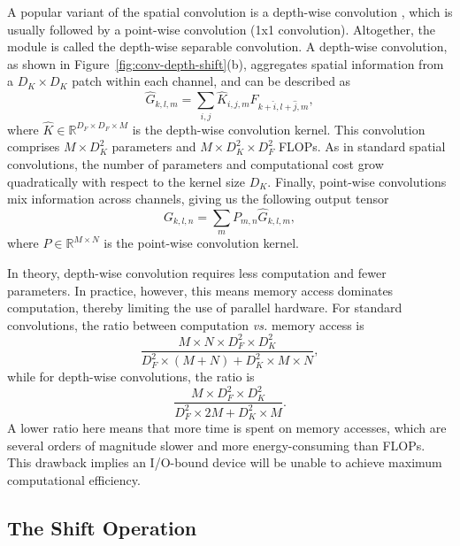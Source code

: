 \documentclass[10pt,twocolumn,letterpaper]{article}
\begin{document}
A popular variant of the spatial convolution is a depth-wise  convolution \cite{MobileNet,Xception}, which is usually followed by a point-wise convolution (1x1 convolution). Altogether, the module is called the depth-wise separable convolution.
A depth-wise convolution, as shown in Figure~\ref{fig:conv-depth-shift}(b), aggregates spatial information from a $D_K \times D_K$ patch within each channel, and can be described as 
\begin{equation}
    \hat{G}_{k, l, m} = \sum_{i, j}\hat{K}_{i, j, m} F_{k+\hat{i},l+\hat{j}, m},
\end{equation}
where $\hat{K} \in \mathbb{R}^{D_F\times D_F\times M}$ is the depth-wise convolution kernel. This convolution comprises $M\times D_K^2$ parameters and $M \times D_K^2 \times D_F^2$ FLOPs. As in standard spatial convolutions, the number of parameters and computational cost grow quadratically with respect to the kernel size $D_K$. Finally, point-wise convolutions mix information across channels, giving us the following output tensor 
\begin{equation}
    G_{k, l, n} = \sum_{m}P_{m, n} \hat{G}_{k,l, m},
    \label{eqn:point-wise}
\end{equation}
where $P\in\mathbb{R}^{M\times N}$ is the point-wise convolution kernel. 

In theory, depth-wise convolution requires less computation and fewer parameters. In practice, however, this means memory access dominates computation, thereby limiting the use of parallel hardware. 
For standard convolutions, the ratio between computation \textit{vs.} memory access is 
\begin{equation}
    \frac{M\times N \times D_F^2 \times D_K^2}{D_F^2\times (M+N) + D_K^2\times M \times N},
    \label{eqn:conv-AI}
\end{equation}
while for depth-wise convolutions, the ratio is 
\begin{equation}
    \frac{M\times D_F^2 \times D_K^2}{D_F^2\times 2M + D_K^2\times M}.
    \label{eqn:depth-AI}
\end{equation}
A lower ratio here means that more time is spent on memory accesses, which are several orders of magnitude slower and more energy-consuming than FLOPs. 
This drawback implies an I/O-bound device will be unable to achieve maximum computational efficiency.

\subsection{The Shift Operation}
\end{document}
